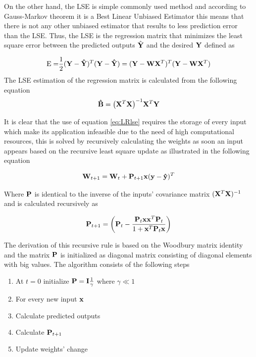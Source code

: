 \documentclass[msc,ai,logo]{infthesis}
\begin{document}
On the other hand, the LSE is simple commonly used      method and according to Gauss-Markov theorem it is a Best Linear Unbiased Estimator this means that there is not any other unbiased estimator that results to less prediction error than the LSE. Thus, the LSE is the regression matrix that minimizes the least square error between the predicted outputs $\hat{\bf{Y}}$ and the desired  ${\bf{Y}}$  defined as

\begin{equation}
{\rm{E = }}\frac{1}{2}{({\bf{Y}} - {\bf{\hat Y}})^T}({\bf{Y}} - {\bf{\hat Y}}) = {({\bf{Y}} - {\bf{W}}{{\bf{X}}^T})^T}({\bf{Y}} - {\bf{W}}{{\bf{X}}^T})
\end{equation}
The LSE estimation of the regression matrix is calculated from the following equation 
\begin{equation}
{\bf{\hat B}} = {\left( {{{\bf{X}}^T}{\bf{X}}} \right)^{ - 1}}{{\bf{X}}^T}{\bf{Y}}
\label{eq:LRlse}
\end{equation}

It is clear that the use of equation \ref{eq:LRlse} requires the storage of every input which make its application infeasible due to the need of high computational resources, this is solved by recursively calculating the weights as soon an input appears based on the recursive least square update as illustrated in the following equation

\begin{equation}
{{\bf{W}}_{t + 1}} = {{\bf{W}}_t} + {{\bf{P}}_{t + 1}}{\bf{x}}{({\bf{y}} - {\bf{\hat y}})^T}
\end{equation}

Where ${{\bf{P}}}$ is identical to the inverse of the inputs' covariance matrix ${({{\bf{X}}^T}{\bf{X}})^{ - 1}}$ and is calculated recursively as

\begin{equation}
{{\bf{P}}_{t + 1}} = \left( {{{\bf{P}}_t} - \frac{{{{\bf{P}}_t}{\bf{x}}{{\bf{x}}^T}{{\bf{P}}_t}}}{{1 + {{\bf{x}}^T}{{\bf{P}}_t}{\bf{x}}}}} \right)
\end{equation}

The derivation of this recursive rule is based on the Woodbury matrix identity and the matrix ${{\bf{P}}}$ is initialized as diagonal matrix consisting of diagonal elements with big values. 
The algorithm consists of the following steps
\begin{enumerate}
\item At $t=0$ initialize ${\bf{P}} = {\bf{I}}\frac{1}{\gamma }$ where $\gamma \ll 1$
\item For every new input $\bf{x}$ 
\item Calculate predicted outputs
\item Calculate ${{\bf{P}}_{t + 1}}$
\item Update weights' change 
\end{enumerate}
\end{document}
